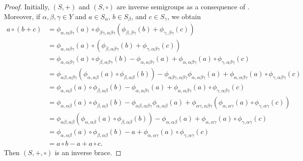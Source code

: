 \documentclass[preprint,1p]{elsarticle}
\theoremstyle{definition}               %
\newcommand{\phii}[2]{\phi_{#1,#2}}
\begin{document}
\begin{proof}
Initially, $(S, +)$ and $(S, \circ)$ are inverse semigroups as a consequence of \cite[Ex.(ii), p.90]{Pe84}. Moreover, if $\alpha, \beta, \gamma \in Y$ and $a \in S_\alpha$, $b \in S_\beta$, and $c \in S_\gamma$, we obtain
\begin{align*}
    a \circ (b+c)
    &=\phii{\alpha}{\alpha\beta\gamma}(a) \circ \phii{\beta\gamma}{\alpha\beta\gamma}\left(\phii{\beta}{\beta\gamma}(b)+\phii{\gamma}{\beta\gamma}(c)\right)\\
    &=\phii{\alpha}{\alpha\beta\gamma}(a) \circ \left(\phii{\beta}{\alpha\beta\gamma}(b)+\phii{\gamma}{\alpha\beta\gamma}(c)\right)\\
    &=\phii{\alpha}{\alpha\beta\gamma}(a) \circ \phii{\beta}{\alpha\beta\gamma}(b)-\phii{\alpha}{\alpha\beta\gamma}(a)+\phii{\alpha}{\alpha\beta\gamma}(a) \circ  \phii{\gamma}{\alpha\beta\gamma}(c)\\
    &=\phii{\alpha\beta}{\alpha\beta\gamma}\left(\phii{\alpha}{\alpha\beta}(a) \circ \phii{\beta}{\alpha\beta}(b)\right)-\phii{\alpha\beta\gamma}{\alpha\beta\gamma}\phii{\alpha}{\alpha\beta\gamma}(a)+\phii{\alpha}{\alpha\beta\gamma}(a) \circ \phii{\gamma}{\alpha\beta\gamma}(c)\\
    &=\phii{\alpha}{\alpha\beta}(a) \circ \phii{\beta}{\alpha\beta}(b)-\phii{\alpha}{\alpha\beta\gamma}(a)+\phii{\alpha}{\alpha\beta\gamma}(a) \circ \phii{\gamma}{\alpha\beta\gamma}(c)\\
    &=\phii{\alpha}{\alpha\beta}(a) \circ \phii{\beta}{\alpha\beta}(b)-\phii{\alpha\beta}{\alpha\beta\gamma}\phii{\alpha}{\alpha\beta}(a)+\phii{\alpha\gamma}{\alpha\beta\gamma}\left(\phii{\alpha}{\alpha\gamma}(a) \circ \phii{\gamma}{\alpha\gamma}(c)\right)\\
    &=\phii{\alpha\beta}{\alpha\beta}\left(\phii{\alpha}{\alpha\beta}(a) \circ \phii{\beta}{\alpha\beta}(b)\right)-\phii{\alpha}{\alpha\beta}(a)+\phii{\alpha}{\alpha\gamma}(a) \circ \phii{\gamma}{\alpha\gamma}(c)\\
    &=\phii{\alpha}{\alpha\beta}(a) \circ \phii{\beta}{\alpha\beta}(b) - a+\phii{\alpha}{\alpha\gamma}(a) \circ \phii{\gamma}{\alpha\gamma}(c) \\
    &=a \circ b -a+a \circ c.
\end{align*}
Then $(S, +, \circ)$ is an inverse brace.
\end{proof}
\end{document}
